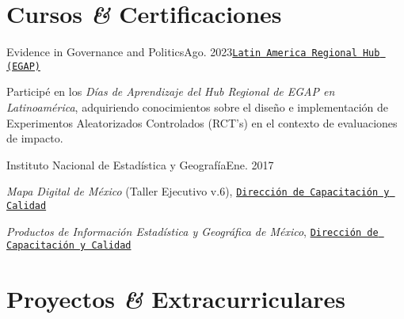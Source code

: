 \documentclass[letter]{resume}
\begin{document}

\section{Cursos \textbf{\em\&} Certificaciones}

\begin{content}


\begin{position}{Evidence in Governance and Politics}{Ago. 2023}{\normalfont\href{https://egap.org/project/learning-days-13-latin-america-regional-hub-workshop/}{\texttt{Latin America Regional Hub (EGAP)}}}{}{}
  \item Participé en los \emph{Días de Aprendizaje del Hub Regional de EGAP en Latinoamérica}, adquiriendo conocimientos sobre el diseño e implementación de Experimentos Aleatorizados Controlados (RCT's) en el contexto de evaluaciones de impacto.
\end{position}

\begin{position}{Instituto Nacional de Estadística y Geografía}{Ene. 2017}{}{}{}
  \item \emph{Mapa Digital de México} (Taller Ejecutivo v.6), {\normalfont\href{https://drive.google.com/file/d/11P-V5IOrVxSAdumvZkqc6cNErlPHsWbA/view?usp=sharing}{\texttt{Dirección de Capacitación y Calidad}}}
  \item \emph{Productos de Información Estadística y Geográfica de México}, {\normalfont\href{https://drive.google.com/file/d/175VzjC148czXa4mLOryoo6QfAnEpCx_z/view?usp=sharing}{\texttt{Dirección de Capacitación y Calidad}}}
\end{position}

\end{content}


\section{Proyectos \textbf{\em\&} Extracurriculares}
\end{document}
